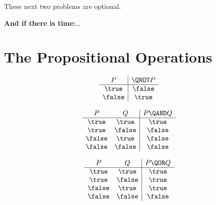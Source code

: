 \documentclass[handout]{mcs}
\begin{document}


\insolutions{\newpage}

\begin{staffnotes}
These next two problems are optional.
\end{staffnotes}

\begin{center}\large
\textbf{And if there is time:}\dots
\end{center}



\instatements{\newpage}
\section*{The Propositional Operations}

\[
\begin{array}{c|c}
P & \QNOT P \\ \hline
\true & \false \\
\false & \true \\
\end{array}
\]

\[
\begin{array}{cc|c}
P & Q & P \QAND Q \\ \hline
\true & \true & \true \\
\true & \false & \false \\
\false & \true & \false \\
\false & \false & \false
\end{array}
\]


\[
\begin{array}{cc|c}
P & Q & P \QOR Q \\ \hline
\true & \true & \true \\
\true & \false & \true \\
\false & \true & \true \\
\false & \false & \false
\end{array}
\]
\end{document}
